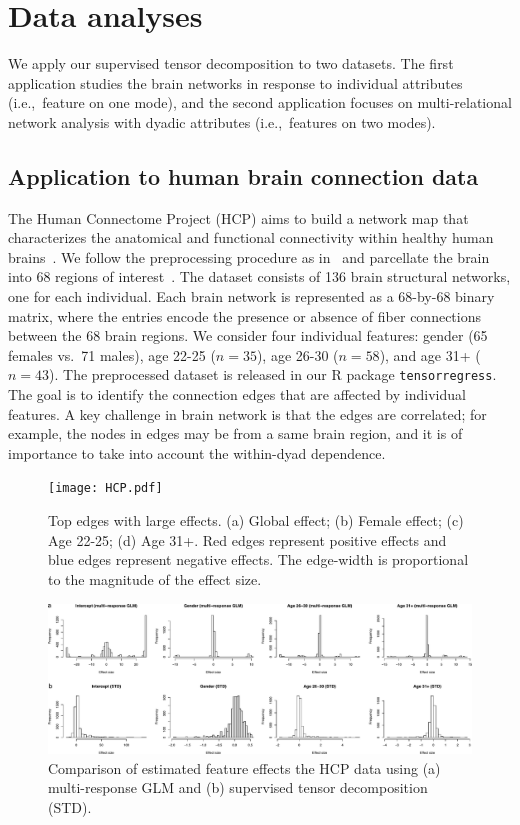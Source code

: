 \documentclass[12pt]{article}
\theoremstyle{definition}
\theoremstyle{definition}
\begin{document}
\section{Data analyses}\label{sec:data}
We apply our supervised tensor decomposition to two datasets. The first application studies the brain networks in response to individual attributes (i.e.,\ feature on one mode), and the second application focuses on multi-relational network analysis with dyadic attributes (i.e.,\ features on two modes). 

\subsection{Application to human brain connection data}
The Human Connectome Project (HCP) aims to build a network map that characterizes the anatomical and functional connectivity within healthy human brains~\citep{HCP}. 
We follow the preprocessing procedure as in~\cite{zhang2018mapping} and parcellate the brain into 68 regions of interest~\citep{desikan2006automated}. The dataset consists of 136 brain structural networks, one for each individual. Each brain network is represented as a 68-by-68 binary matrix, where the entries encode the presence or absence of fiber connections between the 68 brain regions. We consider four individual features: gender (65 females vs.\ 71 males), age 22-25 ($n=35$), age 26-30 ($n=58$), and age 31+ ($n=43$). The preprocessed dataset is released in our R package \texttt{tensorregress}. The goal is to identify the connection edges that are affected by individual features. A key challenge in brain network is that the edges are correlated; for example, the nodes in edges may be from a same brain region, and it is of importance to take into account the within-dyad dependence. 

\begin{figure}[!h]
\centering
\texttt{[image: HCP.pdf]}
\caption{Top edges with large effects. (a) Global effect; (b) Female effect; (c) Age 22-25; (d) Age 31+. Red edges represent positive effects and blue edges represent negative effects. The edge-width is proportional to the magnitude of the effect size.
}\label{fig:brain}
\vspace{1cm}
\includegraphics[width=16cm]{compare_HCP.pdf}
\caption{Comparison of estimated feature effects the HCP data using (a) multi-response GLM and (b) supervised tensor decomposition (STD). }\label{fig:s1}
\end{figure}
\end{document}
